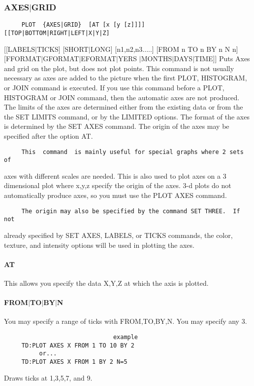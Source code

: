 \subsubsection{AXES$|$GRID}
\begin{verbatim}
     PLOT  {AXES|GRID}  [AT [x [y [z]]]] [[TOP|BOTTOM|RIGHT|LEFT|X|Y|Z]
\end{verbatim}
[[LABELS$|$TICKS]  [SHORT$|$LONG]  [n1,n2,n3.....]   [FROM n TO n BY n N n]
[FFORMAT$|$GFORMAT$|$EFORMAT$|$YERS $|$MONTHS$|$DAYS$|$TIME]] 
Puts Axes and grid on the plot, but does not plot points.  This command
is not usually necessary as axes are added  to  the  picture  when  the
first  PLOT,  HISTOGRAM,  or JOIN command is executed.  If you use this
command before a PLOT, HISTOGRAM or JOIN command,  then  the  automatic
axes  are  not  produced.  The limits of the axes are determined either
from the existing data or from the the SET LIMITS command,  or  by  the
LIMITED  options.  The format of the axes is determined by the SET AXES
command.  The origin of the axes may be specified after the option AT. 

\begin{verbatim}
     This  command  is mainly useful for special graphs where 2 sets of
\end{verbatim}
axes with different scales are needed.  This is also used to plot  axes
on  a  3  dimensional  plot where x,y,z specify the origin of the axes.
3-d plots do not automatically produce axes, so you must use  the  PLOT
AXES command.  

\begin{verbatim}
     The origin may also be specified by the command SET THREE.  If not
\end{verbatim}
already specified by SET AXES, LABELS, or TICKS  commands,  the  color,
texture, and intensity options will be used in plotting the axes.  
\paragraph{AT}
This allows you specify the data X,Y,Z at which the axis is plotted. 
\paragraph{FROM$|$TO$|$BY$|$N}
You  may specify a range of ticks with FROM,TO,BY,N.  You may specify
any 3.  

\begin{verbatim}
                               example
     TD:PLOT AXES X FROM 1 TO 10 BY 2 
          or...  
     TD:PLOT AXES X FROM 1 BY 2 N=5 
\end{verbatim}
Draws ticks at 1,3,5,7, and 9.  
